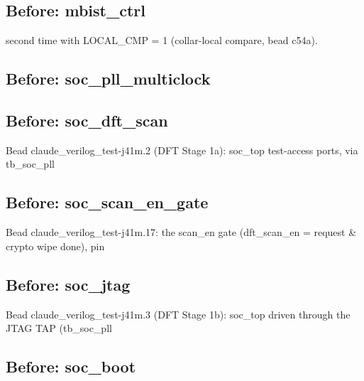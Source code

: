 \begin{record}
\subsection*{Before: mbist\_ctrl}

\begin{textblock}
second time with LOCAL_CMP = 1 (collar-local compare, bead c54a).
\end{textblock}

\subsection*{Before: soc\_pll\_multiclock}


\subsection*{Before: soc\_dft\_scan}

\begin{textblock}
Bead claude_verilog_test-j41m.2 (DFT Stage 1a): soc_top test-access ports, via tb_soc_pll
\end{textblock}

\subsection*{Before: soc\_scan\_en\_gate}

\begin{textblock}
Bead claude_verilog_test-j41m.17: the scan_en gate (dft_scan_en = request & crypto wipe done), pin
\end{textblock}

\subsection*{Before: soc\_jtag}

\begin{textblock}
Bead claude_verilog_test-j41m.3 (DFT Stage 1b): soc_top driven through the JTAG TAP (tb_soc_pll
\end{textblock}

\subsection*{Before: soc\_boot}


\end{record}
